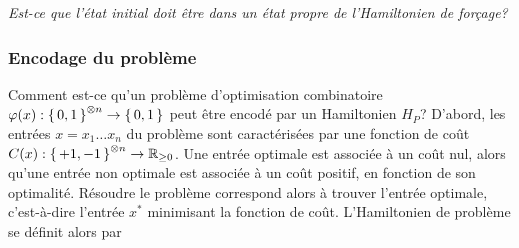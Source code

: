 \textcolor{mydarkred}{\textit{Est-ce que l'état initial doit être dans un état propre de l'Hamiltonien de forçage?}}


\subsubsection{Encodage du problème}
\label{subsec:encodage-probleme}

Comment est-ce qu'un problème d'optimisation combinatoire $\varphi(x):\set{ 0, 1 }^{\otimes n} \to \set{ 0, 1 }$ peut être encodé par un Hamiltonien $H_{P}$? D'abord, les entrées $x = x_{1} \dots x_{n}$ du problème sont caractérisées par une fonction de coût $C(x):\set{ +1, -1 }^{\otimes n} \to \mathbb{R}_{\geq 0}$. Une entrée optimale est associée à un coût nul, alors qu'une entrée non optimale est associée à un coût positif, en fonction de son optimalité. Résoudre le problème correspond alors à trouver l'entrée optimale, c'est-à-dire l'entrée $x^{*}$ minimisant la fonction de coût. L'Hamiltonien de problème se définit alors par

